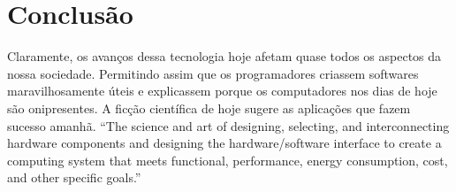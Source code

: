 \documentclass{article}
\begin{document}
    
\section{Conclusão}
 Claramente, os avanços dessa tecnologia hoje afetam quase todos os aspectos da nossa sociedade. Permitindo assim que os programadores criassem softwares maravilhosamente úteis e explicassem porque os computadores nos dias de hoje são onipresentes. A ficção científica de hoje sugere as aplicações que fazem sucesso amanhã. “The science and art of designing, selecting, and interconnecting
hardware components and designing the hardware/software interface
to create a computing system that meets functional, performance,
energy consumption, cost, and other specific goals.”
 \citep{profonurmutulo}
 
 




\end{document}
